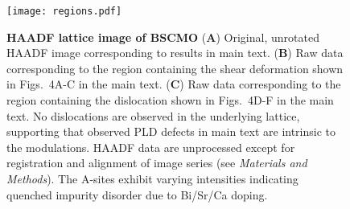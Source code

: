 \documentclass[12pt]{article}
\begin{document}
\begin{figure}
  \texttt{[image: regions.pdf]}
  \caption{\textbf{HAADF lattice image of BSCMO} 
(\textbf{A}) Original, unrotated HAADF image corresponding to results in main text.
(\textbf{B}) Raw data corresponding to the region containing the shear deformation shown in Figs.~4A-C in the main text.
(\textbf{C}) Raw data corresponding to the region containing the dislocation shown in Figs.~4D-F in the main text.
No dislocations are observed in the underlying lattice, supporting that observed PLD defects in main text are intrinsic to the modulations.
HAADF data are unprocessed except for registration and alignment of image series (see \textit{Materials and Methods}).
The A-sites exhibit varying intensities indicating quenched impurity disorder due to Bi/Sr/Ca doping. 
}
\label{F:UnprocData}
\end{figure}

\clearpage


\end{document}
